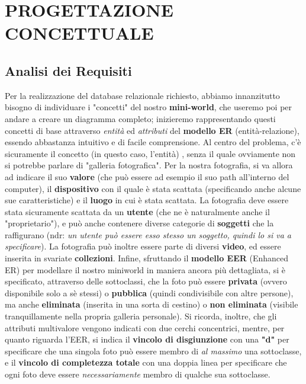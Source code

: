\documentclass[a4paper]{article}
\begin{document}
\vspace{45pt}
\section{PROGETTAZIONE CONCETTUALE}
	\vspace{12pt}
	\subsection{Analisi dei Requisiti}
	\vspace{8pt}
	Per la realizzazione del database relazionale richiesto,
	abbiamo innanzitutto bisogno di individuare i "concetti"
	del nostro \textbf{mini-world}, che useremo poi per
	andare a
	creare un  diagramma completo; inizieremo rappresentando
	questi concetti di base attraverso \emph{entità} ed
	\emph{attributi}
	del
	\textbf{modello ER} (entità-relazione), essendo
	abbastanza
	intuitivo e di facile comprensione. Al centro del
	problema, c'è
	sicuramente il concetto (in questo caso, l'entità)
	, senza il quale
	ovviamente non si potrebbe parlare di "galleria
	fotografica". Per la nostra fotografia, si va allora ad
	indicare
	il suo \textbf{valore} (che può essere ad esempio il suo
	path all'interno del computer),
	il \textbf{dispositivo} con il quale è stata scattata
	(specificando anche alcune sue caratteristiche) e il
	\textbf{luogo} in
	cui è stata scattata. La fotografia deve
	essere stata sicuramente scattata da un \textbf{utente}
	(che ne è
	naturalmente anche il "proprietario"), e può anche
	contenere diverse categorie di
	\textbf{soggetti} che la raffigurano (ndr: \emph{un
	utente può
	essere
	esso stesso un soggetto, quindi lo si va a
	specificare}). La fotografia può inoltre essere parte di
	diversi \textbf{video}, ed essere inserita in svariate
	\textbf{collezioni}.
	Infine, sfruttando il \textbf{modello EER}
	(Enhanced ER) per
	modellare il nostro miniworld in maniera ancora più
	dettagliata, si è specificato, attraverso delle
	sottoclassi, che la foto può essere \textbf{privata}
	(ovvero disponibile solo a sè stessi) o
	\textbf{pubblica} (quindi condivisibile con altre
	persone), ma
	anche \textbf{eliminata}
	(inserita in una sorta di cestino) o \textbf{non
	eliminata}
	(visibile tranquillamente nella propria galleria
	personale). 
	Si ricorda, inoltre, che gli attributi
	multivalore vengono indicati con
	due cerchi concentrici, mentre, per quanto
	riguarda l'EER, si indica il
	\textbf{vincolo di disgiunzione} con una \textbf{"d"} per
	specificare 
	che una
	singola foto può essere membro di \emph{al massimo} una
	sottoclasse, e il \textbf{vincolo di
	completezza
	totale}
	con una doppia linea per specificare che ogni foto deve
	essere \emph{necessariamente} membro di qualche sua
	sottoclasse.
\end{document}
